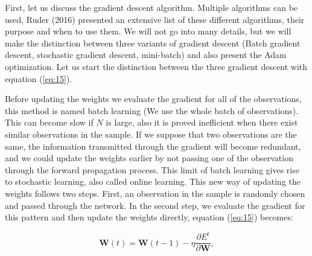 \documentclass[a4paper,12pt]{article}
\numberwithin{equation}{section}
\begin{document}
First, let us discuss the gradient descent algorithm. Multiple algorithms can be used, Ruder (2016) presented an extensive list of these different algorithms, their purpose and when to use them. We will not go into many details, but we will make the distinction between three variants of gradient descent (Batch gradient descent, stochastic gradient descent, mini-batch) and also present the Adam optimization. Let us start the distinction between the three gradient descent with equation (\ref{eq:15}). \par
Before updating the weights we evaluate the gradient for all of the observations, this method is named batch learning (We use the whole batch of observations). This can become slow if $N$ is large, also it is proved inefficient when there exist similar observations in the sample. If we suppose that two observations are the same, the information transmitted through the gradient will become redundant, and we could update the weights earlier by not passing one of the observation through the forward propagation process. This limit of batch learning gives rise to stochastic learning, also called online learning. This new way of updating the weights follows two steps. First, an observation in the sample is randomly chosen and passed through the network. In the second step, we evaluate the gradient for this pattern and then update the weights directly, equation (\ref{eq:15}) becomes:

\begin{equation}\label{eq:16}
\boldsymbol{W}(t) = \boldsymbol{W}(t-1) - \eta\frac{\partial E^t}{\partial \boldsymbol{W}},
\end{equation}
\end{document}
